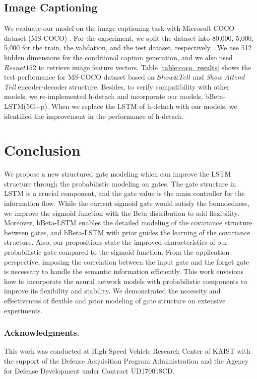 \documentclass[letterpaper]{article} %
\begin{document}
\subsection{Image Captioning} %
We evaluate our model on the image captioning task with Microsoft COCO dataset (MS-COCO) \cite{MSCOCO2014}. For the experiment, we split the dataset into 80,000, 5,000, 5,000 for the train, the validation, and the test dataset, respectively \cite{karpathy2015deep}. We use 512 hidden dimensions for the conditional caption generation, and we also used $Resnet152$ to retrieve image feature vectors.
Table \ref{table:coco_results} shows the test performance for MS-COCO dataset based on $Show\&Tell$ \cite{vinyals2015show} and \emph{Show Attend Tell} \cite{xu2015show} encoder-decoder structure.
Besides, to verify compatibility with other models, we re-implemented h-detach \cite{hdetach2019} and incorporate our models, bBeta-LSTM(5G+p).
When we replace the LSTM of h-detach with our models, we identified the improvement in the performance of h-detach.

\section{Conclusion}
We propose a new structured gate modeling which can improve the LSTM structure through the probabilistic modeling on gates. 
The gate structure in LSTM is a crucial component, and the gate value is the main controller for the information flow.
While the current sigmoid gate would satisfy the boundedness, we improve the sigmoid function with the Beta distribution to add flexibility. Moreover, bBeta-LSTM enables the detailed modeling of the covariance structure between gates, and bBeta-LSTM with prior guides the learning of the covariance structure. 
Also, our propositions state the improved characteristics of our probabilistic gate compared to the sigmoid function. 
From the application perspective, imposing the correlation between the input gate and the forget gate is necessary to handle the semantic information efficiently. 
This work envisions how to incorporate the neural network models with probabilistic components to improve its flexibility and stability. We demonstrated the necessity and effectiveness of flexible and prior modeling of gate structure on extensive experiments.

\subsubsection{Acknowledgments.}
This work was conducted at High-Speed Vehicle Research Center of KAIST with the support of the Defense Acquisition Program Administration and the Agency for Defense Development under Contract UD170018CD.

\clearpage


\end{document}
